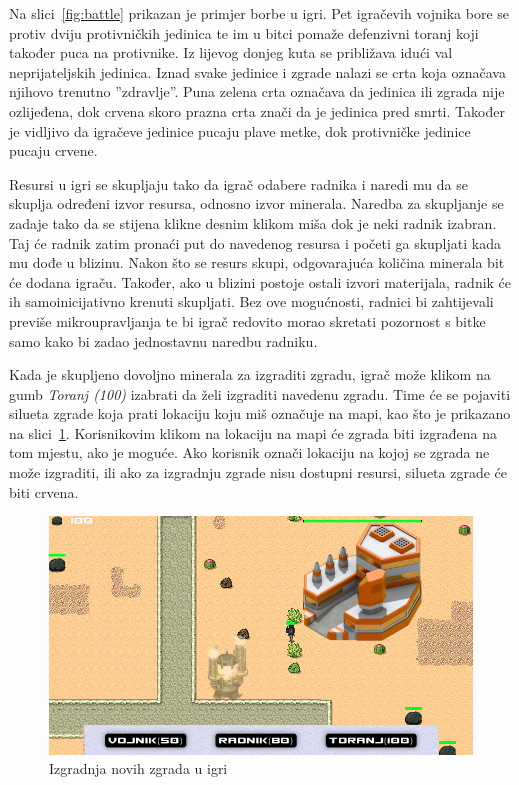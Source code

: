 \documentclass[times, utf8, zavrsni, numeric]{fer}
\begin{document}
\par Na slici~\ref{fig:battle} prikazan je primjer borbe u igri.
Pet igračevih vojnika bore se protiv dviju protivničkih jedinica te im u bitci pomaže defenzivni toranj koji također puca na protivnike.
Iz lijevog donjeg kuta se približava idući val neprijateljskih jedinica.
Iznad svake jedinice i zgrade nalazi se crta koja označava njihovo trenutno ''zdravlje''.
Puna zelena crta označava da jedinica ili zgrada nije ozlijeđena, dok crvena skoro prazna crta znači da je jedinica pred smrti.
Također je vidljivo da igračeve jedinice pucaju plave metke, dok protivničke jedinice pucaju crvene.

\par Resursi u igri se skupljaju tako da igrač odabere radnika i naredi mu da se skuplja određeni izvor resursa, odnosno izvor minerala.
Naredba za skupljanje se zadaje tako da se stijena klikne desnim klikom miša dok je neki radnik izabran.
Taj će radnik zatim pronaći put do navedenog resursa i početi ga skupljati kada mu dođe u blizinu.
Nakon što se resurs skupi, odgovarajuća količina minerala bit će dodana igraču.
Također, ako u blizini postoje ostali izvori materijala, radnik će ih samoinicijativno krenuti skupljati.
Bez ove mogućnosti, radnici bi zahtijevali previše mikroupravljanja te bi igrač redovito morao skretati pozornost s bitke samo kako bi zadao jednostavnu naredbu radniku.

\par Kada je skupljeno dovoljno minerala za izgraditi zgradu, igrač može klikom na gumb \textit{Toranj (100)} izabrati da želi izgraditi navedenu zgradu.
Time će se pojaviti silueta zgrade koja prati lokaciju koju miš označuje na mapi, kao što je prikazano na slici~\ref{fig:building}.
Korisnikovim klikom na lokaciju na mapi će zgrada biti izgrađena na tom mjestu, ako je moguće.
Ako korisnik označi lokaciju na kojoj se zgrada ne može izgraditi, ili ako za izgradnju zgrade nisu dostupni resursi, silueta zgrade će biti crvena.

\begin{figure}[h]
	\centering
	\includegraphics[width=0.9\linewidth]{images/building.png}
	\caption{Izgradnja novih zgrada u igri}
	\label{fig:building}
\end{figure}
\end{document}
